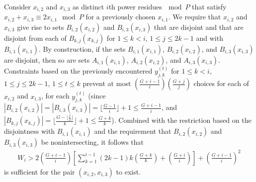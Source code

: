 Consider $x_{i,2}$ and $x_{i,3}$ as distinct $i$th power
residues$~\mod P$ that satisfy $x_{i,2}+ x_{i,3} \equiv 2x_{i,1}
\mod P$ for a previously chosen $x_{i,1}$. We require that
 $x_{i,2}$ and $x_{i,3}$ give rise to sets $B_{i,2}(x_{i,2})$ and
$B_{i,3}(x_{i,3})$ that are disjoint and that are disjoint from each
of $B_{k,j}(x_{k,j})$ for $1\leq k < i$, $1\leq j \leq 2k-1$ and
with $B_{i,1}(x_{i,1})$. By construction, if the sets
$B_{i,1}(x_{i,1})$, $B_{i,2}(x_{i,2})$, and $B_{i,3}(x_{i,3})$ are
disjoint, then so are sets $A_{i,1}(x_{i,1})$, $A_{i,2}(x_{i,2})$,
and $A_{i,3}(x_{i,3})$. Constraints based on the previously
encountered $y_{j,k}^{(t)}$ for $1\leq k < i$, $1\leq j \leq 2k-1$,
$1 \leq t \leq k$ prevent at most $(\frac{G+i-1}{i})(\frac{G+j}{j})$
choices for each of $x_{i,2}$ and $x_{i,3}$, for each
$y_{j,k}^{(t)}$ (since $|B_{i,2}(x_{i,2})|=|B_{i,3}(x_{i,3})|=
\lfloor \frac{G-1}{i} \rfloor+1 \leq \frac{G+i-1}{i}$, and
$|B_{k,j}(x_{k,j})|=\lfloor \frac{G-\lfloor \frac{j}{2}\rfloor}{k}
\rfloor+1 \leq \frac{G+k}{k}$). Combined with the restriction based
on the disjointness with $B_{i,1}(x_{i,1})$ and the requirement that
$B_{i,2}(x_{i,2})$ and $B_{i,3}(x_{i,3})$ be nonintersecting, it
follows that
\begin{equation}\begin{array}{lll} W_i>
2\left(\frac{G+i-1}{i}\right) \left[\sum_{k=1}^{i-1}
(2k-1)k(\frac{G+k}{k})+\left( \frac{G+i}{i}\right)\right]+\left(
\frac{G+i-1}{i}\right)^2
\end{array}\end{equation}
is sufficient for the pair $(x_{i,2},x_{i,3})$ to exist.


